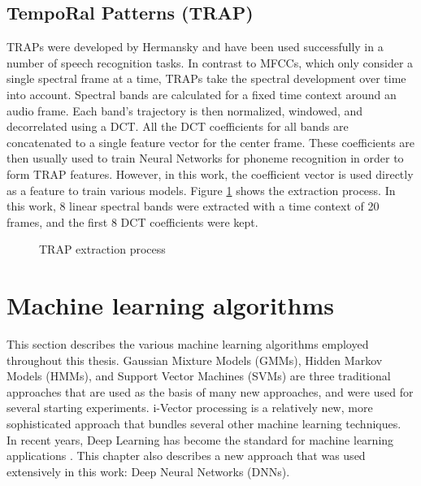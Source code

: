 \subsection{TempoRal Patterns (TRAP)} 
TRAPs were developed by Hermansky \cite{traps1} \cite{traps2} and have been used successfully in a number of speech recognition tasks. In contrast to MFCCs, which only consider a single spectral frame at a time, TRAPs take the spectral development over time into account. Spectral bands are calculated for a fixed time context around an audio frame. Each band's trajectory is then normalized, windowed, and decorrelated using a DCT. All the DCT coefficients for all bands are concatenated to a single feature vector for the center frame. These coefficients are then usually used to train Neural Networks for phoneme recognition \cite{yan_barnard}\cite{matejka} in order to form TRAP features.  However, in this work, the coefficient vector is used directly as a feature to train various models. Figure \ref{fig:traps} shows the extraction process. In this work, 8 linear spectral bands were extracted with a time context of 20 frames, and the first 8 DCT coefficients were kept.
\begin{figure}
 \centerline{}
 \caption{TRAP extraction process \cite{jens}}
 \label{fig:traps}
\end{figure}


\section{Machine learning algorithms}
This section describes the various machine learning algorithms employed throughout this thesis. Gaussian Mixture Models (GMMs), Hidden Markov Models (HMMs), and Support Vector Machines (SVMs) are three traditional approaches that are used as the basis of many new approaches, and were used for several starting experiments. i-Vector processing is a relatively new, more sophisticated approach that bundles several other machine learning techniques.\\
In recent years, Deep Learning has become the standard for machine learning applications \cite{}. This chapter also describes a new approach that was used extensively in this work: Deep Neural Networks (DNNs).

